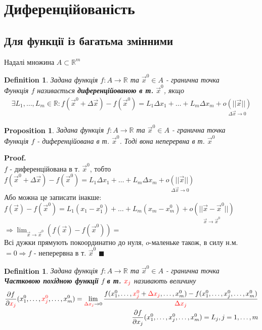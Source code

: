 \documentclass[a4paper, 14pt]{extarticle}
\def\huge{\displaystyle}
\theoremstyle{theoremdd}
\theoremstyle{theoremdd}
\newtheorem{definition}[theorem]{Definition}
\theoremstyle{theoremdd}
\theoremstyle{theoremdd}
\theoremstyle{theoremdd}
\newtheorem{proposition}[theorem]{Proposition}
\theoremstyle{theoremdd}
\theoremstyle{theoremdd}
\theoremstyle{theoremdd}
\newenvironment{pf}{\vspace*{-3mm} \textbf{Proof. \\}}{$\blacksquare$}
\begin{document}
\section{Диференційованість}
\subsection{Для функції із багатьма змінними}
Надалі множина $A \subset \mathbb{R}^m$
\begin{definition}
Задана функція $f: A \to \mathbb{R}$ та $\vec{x}^0 \in A$ - гранична точка\\
Функція $f$ називається \textbf{диференційованою в т.} $\vec{x}^0$, якщо
\begin{align*}
\exists L_1,\dots, L_m \in \mathbb{R}: f(\vec{x}^0 + \Delta \vec{x}) - f(\vec{x}^0) = L_1 \Delta x_1 + \dots + L_m \Delta x_m + \underset{\Delta \vec{x} \to 0}{o(||\vec{x}||)}
\end{align*}
\end{definition}

\begin{proposition}
Задана функція $f: A \to \mathbb{R}$ та $\vec{x}^0 \in A$ - гранична точка\\
Функція $f$ - диференційована в т. $\vec{x}^0$. Тоді вона неперервна в т. $\vec{x}^0$
\end{proposition}
\begin{pf}
$f$ - диференційована в т. $\vec{x}^0$, тобто\\
$f(\vec{x}^0 + \Delta \vec{x}) - f(\vec{x}^0) = L_1 \Delta x_1 + \dots + L_m \Delta x_m + \underset{\Delta \vec{x} \to 0}{o(||\vec{x}||)}$\\
Або можна це записати інакше:\\
$f(\vec{x}) - f(\vec{x}^0) = L_1(x_1 - x_1^0) + \dots + L_m(x_m - x_m^0) + \underset{\vec{x} \to \vec{x}^0}{o(||\vec{x}-\vec{x}^0||)}$\\
$\Rightarrow \huge \lim_{\vec{x} \to \vec{x}^0} (f(\vec{x}) - f(\vec{x}^0)) \boxed{=}$\\
Всі дужки прямують покоординатно до нуля, $o$-маленьке також, в силу н.м. \\
$\boxed{=} 0 \Rightarrow f$ - неперервна в т. $\vec{x}^0$
\end{pf}

\begin{definition}
Задана функція $f: A \to \mathbb{R}$ та $\vec{x}^0 \in A$ - гранична точка\\
\textbf{Частковою похідною функції} $f$ \textbf{в т.} $\textcolor{red}{x_j}$ називають величину
\begin{align*}
\dfrac{\partial f}{\partial \textcolor{red}{x_j}} (x_1^0, \dots, \textcolor{red}{x_j^0}, \dots, x_m^0) = \huge \lim_{\textcolor{red}{\Delta x_j} \to 0} \dfrac{f(x_1^0,\dots,\textcolor{red}{x_j^0} + \textcolor{red}{\Delta x_j}, \dots, x_m^0) - f(x_1^0,\dots,x_j^0, \dots, x_m^0)}{\textcolor{red}{\Delta x_j}} \\
\dfrac{\partial f}{\partial x_j} (x_1^0, \dots, x_j^0, \dots, x_m^0) = L_j, j = 1,\dots,m
\end{align*}
\end{definition}
\end{document}
